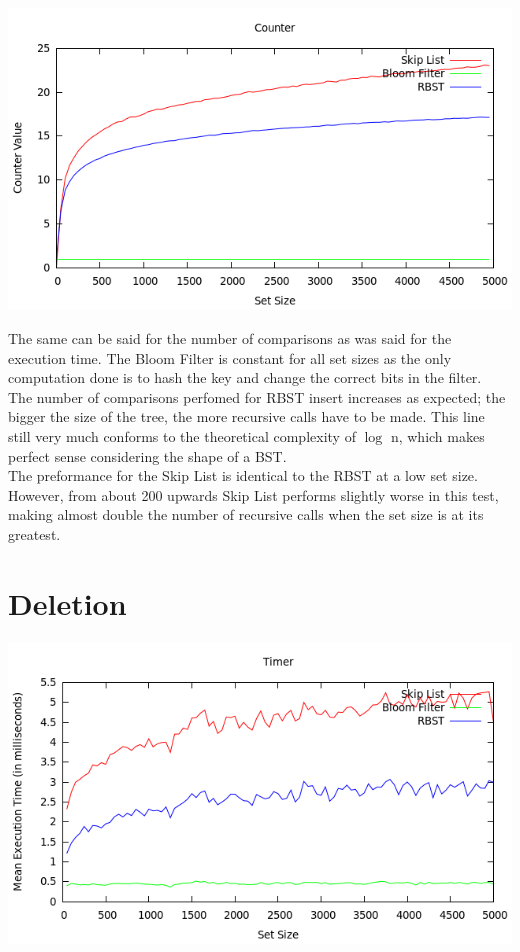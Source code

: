 \documentclass[11pt, notitlepage]{report}
\begin{document}
\includegraphics[width=\linewidth]{img/Counter-Add}

The same can be said for the number of comparisons as was said for the execution time. The Bloom Filter is constant for all set sizes as the only computation done is to hash the key and change the correct bits in the filter.\\

The number of comparisons perfomed for RBST insert increases as expected; the bigger the size of the tree, the more recursive calls have to be made. This line still very much conforms to the theoretical complexity of $\log$ n, which makes perfect sense considering the shape of a BST.\\

The preformance for the Skip List is identical to the RBST at a low set size. However, from about 200 upwards Skip List performs slightly worse in this test, making almost double the number of recursive calls when the set size is at its greatest.

\section*{Deletion}

\includegraphics[width=\linewidth]{img/Timer-Del}
\end{document}
